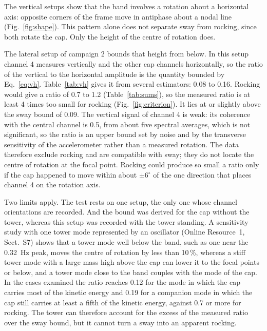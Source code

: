 \documentclass[11pt]{article}
\newcommand{\degr}{$^{\circ}$}
\begin{document}
The vertical setups show that the band involves a rotation about a horizontal axis: opposite corners of the frame move in antiphase about a nodal line (Fig.~\ref{fig:shape}). This pattern alone does not separate sway from rocking, since both rotate the cap. Only the height of the centre of rotation does.

The lateral setup of campaign 2 bounds that height from below. In this setup channel 4 measures vertically and the other cap channels horizontally, so the ratio of the vertical to the horizontal amplitude is the quantity bounded by Eq.~\eqref{eq:vh}. Table~\ref{tab:vh} gives it from several estimators: 0.08 to 0.16. Rocking would give a ratio of 0.7 to 1.2 (Table~\ref{tab:sums}), so the measured ratio is at least 4 times too small for rocking (Fig.~\ref{fig:criterion}). It lies at or slightly above the sway bound of 0.09. The vertical signal of channel 4 is weak: its coherence with the central channel is 0.5, from about five spectral averages, which is not significant, so the ratio is an upper bound set by noise and by the transverse sensitivity of the accelerometer rather than a measured rotation. The data therefore exclude rocking and are compatible with sway; they do not locate the centre of rotation at the focal point. Rocking could produce so small a ratio only if the cap happened to move within about $\pm6$\degr{} of the one direction that places channel 4 on the rotation axis.

Two limits apply. The test rests on one setup, the only one whose channel orientations are recorded. And the bound was derived for the cap without the tower, whereas this setup was recorded with the tower standing. A sensitivity study with one tower mode represented by an oscillator (Online Resource~1, Sect.~S7) shows that a tower mode well below the band, such as one near the 0.32~Hz peak, moves the centre of rotation by less than 10\,\%, whereas a stiff tower mode with a large mass high above the cap can lower it to the focal points or below, and a tower mode close to the band couples with the mode of the cap. In the cases examined the ratio reaches 0.12 for the mode in which the cap carries most of the kinetic energy and 0.19 for a companion mode in which the cap still carries at least a fifth of the kinetic energy, against 0.7 or more for rocking. The tower can therefore account for the excess of the measured ratio over the sway bound, but it cannot turn a sway into an apparent rocking.
\end{document}
